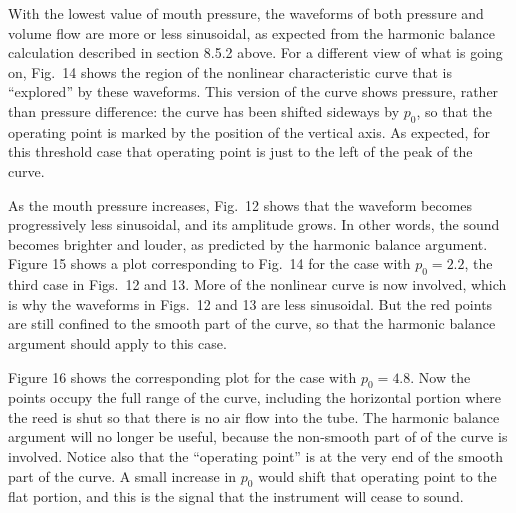   With the lowest value of mouth pressure, the waveforms of both pressure and 
  volume flow are more or less sinusoidal, as expected from the harmonic 
  balance calculation described in section 8.5.2 above. For a different view of 
  what is going on, Fig.\ 14 shows the region of the nonlinear characteristic 
  curve that is ``explored'' by these waveforms. This version of the curve 
  shows pressure, rather than pressure difference: the curve has been shifted 
  sideways by $p_0$, so that the operating point is marked by the position of 
  the vertical axis. As expected, for this threshold case that operating point 
  is just to the left of the peak of the curve. 


  As the mouth pressure increases, Fig.\ 12 shows that the waveform becomes 
  progressively less sinusoidal, and its amplitude grows. In other words, the 
  sound becomes brighter and louder, as predicted by the harmonic balance 
  argument. Figure 15 shows a plot corresponding to Fig.\ 14 for the case with 
  $p_0=2.2$, the third case in Figs.\ 12 and 13. More of the nonlinear curve is 
  now involved, which is why the waveforms in Figs.\ 12 and 13 are less 
  sinusoidal. But the red points are still confined to the smooth part of the 
  curve, so that the harmonic balance argument should apply to this case. 


  Figure 16 shows the corresponding plot for the case with $p_0=4.8$. Now the 
  points occupy the full range of the curve, including the horizontal portion 
  where the reed is shut so that there is no air flow into the tube. The 
  harmonic balance argument will no longer be useful, because the non-smooth 
  part of of the curve is involved. Notice also that the ``operating point'' is 
  at the very end of the smooth part of the curve. A small increase in $p_0$ 
  would shift that operating point to the flat portion, and this is the signal 
  that the instrument will cease to sound. 

